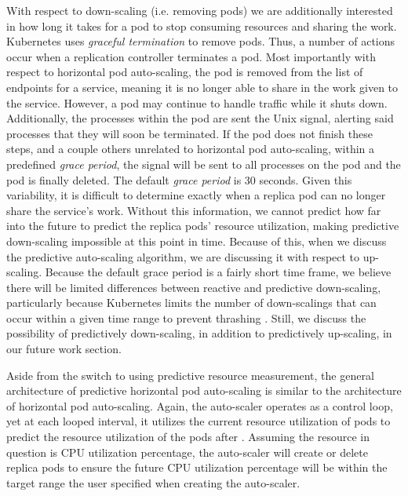 With respect to down-scaling (i.e. removing pods) we are additionally
interested in how long it takes for a pod to stop consuming resources and
sharing the work. Kubernetes uses \textit{graceful termination} to remove pods. Thus, a
number of actions occur when a replication controller terminates a pod. Most
importantly with respect to horizontal pod auto-scaling, the pod is removed from
the list of endpoints for a service, meaning it is no longer able to share in
the work given to the service. However, a pod may continue to handle traffic while
it shuts down. Additionally, the processes within the pod are sent the
 Unix signal, alerting said processes that they will soon be
terminated. If the pod does not finish these steps, and a couple others
unrelated to horizontal pod auto-scaling, within a predefined \textit{grace
period}, the  signal will be sent to all processes on the pod
and the pod is finally deleted. The default \textit{grace period} is 30
seconds.\cite{k8s-pods} Given this variability, it is difficult
to determine exactly when a replica pod can no longer share the service's work.
Without this information, we cannot predict how far into the future to predict
the replica pods' resource utilization, making predictive down-scaling
impossible at this point in time. Because of
this, when we discuss the predictive auto-scaling algorithm, we are discussing it
with respect to up-scaling. Because the default grace period is a fairly short
time frame, we believe there will be limited differences between reactive and
predictive down-scaling, particularly because Kubernetes limits the number of
down-scalings that can occur within a given time range to prevent thrashing
\cite{k8s-horizontal-pod-autoscaler-proposal}. Still, we discuss the possibility
of predictively down-scaling, in addition to predictively up-scaling, in our
future work section.

Aside from the switch to using predictive resource measurement, the
general architecture of predictive horizontal pod auto-scaling is similar to the
architecture of horizontal pod auto-scaling. Again, the auto-scaler operates as a
control loop, yet at each looped interval, it utilizes the current resource
utilization of pods to predict the resource utilization of the pods after
. Assuming the resource in question is CPU
utilization percentage, the auto-scaler will create or delete replica pods
to ensure the future CPU utilization percentage will be within the target range
the user specified when creating the auto-scaler.
